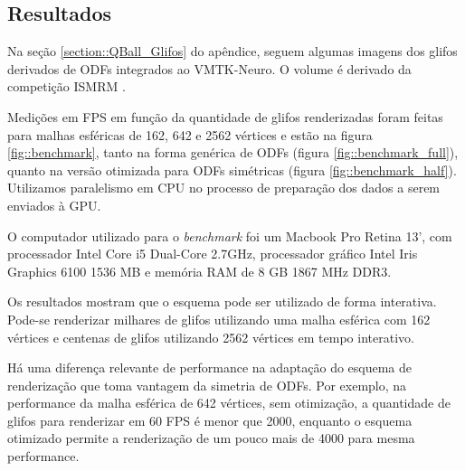 \documentclass[
    12pt,                %
    oneside,            %
    a4paper,            %
    english,            %
    french,                %
    spanish,            %
    brazil                %
    ]{abntex2}
\begin{document}

\subsection{Resultados}


Na seção \ref{section::QBall_Glifos} do apêndice, seguem algumas imagens dos glifos derivados de ODFs integrados ao VMTK-Neuro. O volume é derivado da competição ISMRM \cite{TractometerTool}.

Medições em FPS em função da quantidade de glifos renderizadas foram feitas para malhas esféricas de 162, 642 e 2562 vértices e estão na figura \ref{fig::benchmark}, tanto na forma genérica de ODFs (figura \ref{fig::benchmark_full}), quanto na versão otimizada para ODFs simétricas (figura \ref{fig::benchmark_half}). Utilizamos paralelismo em CPU no processo de preparação dos dados a serem enviados à GPU.


O computador utilizado para o \textit{benchmark} foi um Macbook Pro Retina 13', com processador Intel Core i5 Dual-Core 2.7GHz, processador gráfico Intel Iris Graphics 6100 1536 MB e memória RAM de 8 GB 1867 MHz DDR3.

Os resultados mostram que o esquema pode ser utilizado de forma interativa. Pode-se renderizar milhares de glifos utilizando uma malha esférica com 162 vértices e centenas de glifos utilizando 2562 vértices em tempo interativo.

Há uma diferença relevante de performance na adaptação do esquema de renderização que toma vantagem da simetria de ODFs. Por exemplo, na performance da malha esférica de 642 vértices, sem otimização, a quantidade de glifos para renderizar em 60 FPS é menor que 2000, enquanto o esquema otimizado permite a renderização de um pouco mais de 4000 para mesma performance.
\end{document}

